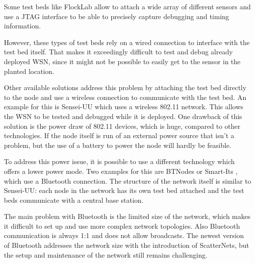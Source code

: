 Some test beds like FlockLab \cite{Lim2013} allow to attach a wide array of different sensors and use a JTAG interface to be able to precisely capture debugging and timing information.

However, these types of test beds rely on a wired connection to interface with the test bed itself. That makes it exceedingly difficult to test and debug already deployed WSN, since it might not be possible to easily get to the sensor in the planted location.

Other available solutions address this problem by attaching the test bed directly to the node and use a wireless connection to communicate with the test bed. An example for this is Sensei-UU \cite{Rensfelt2009} which uses a wireless 802.11 network. This allows the WSN to be tested and debugged while it is deployed. One drawback of this solution is the power draw of 802.11 devices, which is huge, compared to other technologies. If the node itself is run of an external power source that isn't a problem, but the use of a battery to power the node will hardly be feasible.

To address this power issue, it is possible to use a different technology which offers a lower power mode. Two examples for this are BTNodes \cite{Moser} or Smart-Its \cite{Kasten2000}, which use a Bluetooth connection. 
The structure of the network itself is similar to Sensei-UU: each node in the network has its own test bed attached and the test beds communicate with a central base station.

The main problem with Bluetooth is the limited size of the network, which makes it difficult to set up and use more complex network topologies. Also Bluetooth communication is always 1:1 and does not allow broadcasts. The newest version of Bluetooth addresses the network size with the introduction of ScatterNets, but the setup and maintenance of the network still remains challenging.